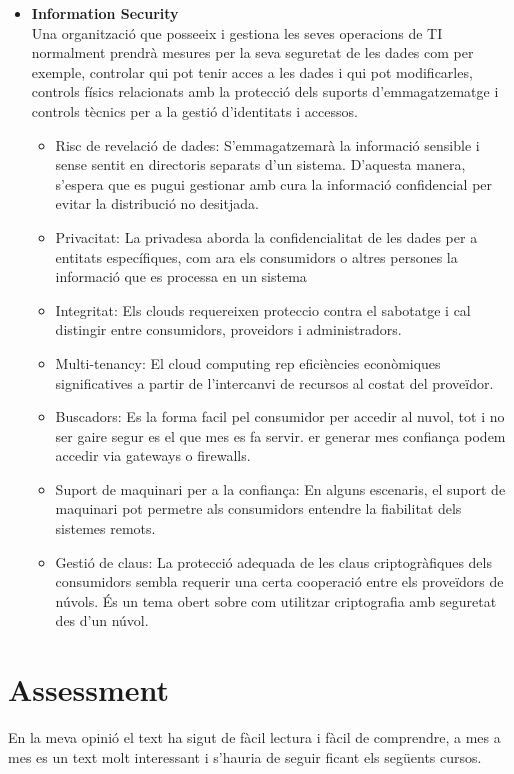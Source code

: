 \documentclass[a4paper, 10pt]{article}
\begin{document}
\begin{itemize}
    \item \textbf{Information Security}\\
     Una organització que posseeix i gestiona les seves operacions de TI normalment prendrà mesures per la seva seguretat de les dades com per exemple, controlar qui pot tenir acces a les dades i qui pot modificarles, controls físics relacionats amb la protecció dels suports d’emmagatzematge i controls tècnics per a la gestió d'identitats i accessos.
    \begin{itemize}
        \item Risc de revelació de dades: S'emmagatzemarà la informació sensible i sense sentit en directoris separats d'un sistema. D'aquesta manera, s'espera que es pugui gestionar amb cura la informació confidencial per evitar la distribució no desitjada.
        \item Privacitat: La privadesa aborda la confidencialitat de les dades per a entitats específiques, com ara els consumidors o altres persones la informació que es processa en un sistema
        \item Integritat: Els clouds requereixen proteccio contra el sabotatge i cal distingir entre consumidors, proveidors i administradors.
        \item Multi-tenancy: El cloud computing rep eficiències econòmiques significatives a partir de l’intercanvi de recursos al costat del proveïdor. 
        \item Buscadors: Es la forma facil pel consumidor per accedir al nuvol, tot i no ser gaire segur es el que mes es fa servir. er generar mes confiança podem accedir via gateways o firewalls.
        \item Suport de maquinari per a la confiança: En alguns escenaris, el suport de maquinari pot permetre als consumidors entendre la fiabilitat dels sistemes remots.
        \item Gestió de claus: La protecció adequada de les claus criptogràfiques dels consumidors sembla requerir una certa cooperació entre els proveïdors de núvols. És un tema obert sobre com utilitzar criptografia amb seguretat des d’un núvol.
    \end{itemize}
\end{itemize}


\section{Assessment}

En la meva opinió el text ha sigut de fàcil lectura i fàcil de comprendre, a mes a mes es un text molt interessant i s'hauria de seguir ficant els següents cursos.
\end{document}
